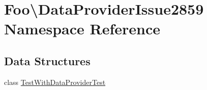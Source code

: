 \hypertarget{namespace_foo_1_1_data_provider_issue2859}{}\section{Foo\textbackslash{}Data\+Provider\+Issue2859 Namespace Reference}
\label{namespace_foo_1_1_data_provider_issue2859}
\subsection*{Data Structures}
\begin{DoxyCompactItemize}
\item 
class \mbox{\hyperlink{class_foo_1_1_data_provider_issue2859_1_1_test_with_data_provider_test}{Test\+With\+Data\+Provider\+Test}}
\end{DoxyCompactItemize}

